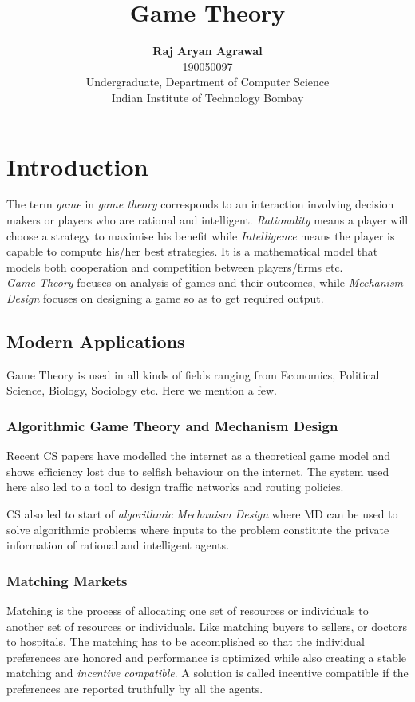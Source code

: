 \documentclass{article}
\title{Game Theory}
\author{
	\textbf{Raj Aryan Agrawal}\\
	190050097\\
	Undergraduate, Department of Computer Science\\
	Indian Institute of Technology Bombay
}
\theoremstyle{definition}
\begin{document}
\maketitle
\setcounter{tocdepth}{2}
\tableofcontents

\section{Introduction}
The term \textit{game} in \textit{game theory} corresponds to an interaction involving decision makers or players who are rational and intelligent. \textit{Rationality} means a player will choose a strategy to maximise his benefit while \textit{Intelligence} means the player is capable to compute his/her best strategies. It is a mathematical model that models both cooperation and competition between players/firms etc.\\

\textit{Game Theory} focuses on analysis of games and their outcomes, while \textit{Mechanism Design} focuses on designing a game so as to get required output.
\subsection{Modern Applications}
Game Theory is used in all kinds of fields ranging from Economics, Political Science, Biology, Sociology etc. Here we mention a few.
\subsubsection*{Algorithmic Game Theory and Mechanism Design}
Recent CS papers have modelled the internet as a theoretical game model and shows efficiency lost due to selfish behaviour on the internet. The system used here also led to a tool to design traffic networks and routing policies.

CS also led to start of \textit{algorithmic Mechanism Design} where MD can be used to solve algorithmic problems where inputs to the problem constitute the private information of rational and intelligent agents.
\subsubsection*{Matching Markets}
Matching is the process of allocating one set of resources or individuals to another set of resources or individuals. Like matching buyers to sellers, or doctors to hospitals. The matching has to be accomplished so that the individual preferences are honored and performance is optimized while also creating a stable matching and \textit{incentive compatible}. A solution is called incentive compatible if the preferences are reported truthfully by all the agents.
\end{document}
